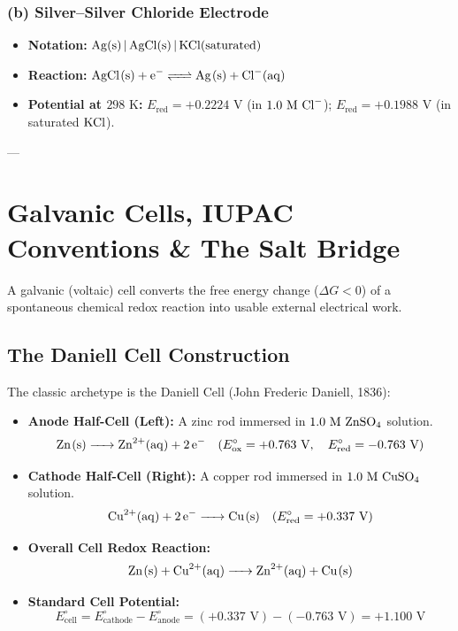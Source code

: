 \subsubsection{(b) Silver--Silver Chloride Electrode}
\begin{itemize}[leftmargin=*]
    \item \textbf{Notation:} $\ce{Ag(s) | AgCl(s) | KCl(saturated)}$
    \item \textbf{Reaction:} $\ce{AgCl(s) + e^- <=> Ag(s) + Cl^-(aq)}$
    \item \textbf{Potential at $298\text{ K}$:} $E_{\text{red}} = +0.2224\text{ V}$ (in $1.0\text{ M } \ce{Cl-}$); $E_{\text{red}} = +0.1988\text{ V}$ (in saturated $\ce{KCl}$).
\end{itemize}

---

\section{Galvanic Cells, IUPAC Conventions \& The Salt Bridge}

A galvanic (voltaic) cell converts the free energy change ($\Delta G < 0$) of a spontaneous chemical redox reaction into usable external electrical work.

\subsection{The Daniell Cell Construction}
The classic archetype is the Daniell Cell (John Frederic Daniell, 1836):
\begin{itemize}[leftmargin=*]
    \item \textbf{Anode Half-Cell (Left):} A zinc rod immersed in $1.0\text{ M } \ce{ZnSO4}$ solution.
    \begin{equation}
        \ce{Zn(s) -> Zn^2+(aq) + 2e^-} \quad (E^\circ_{\text{ox}} = +0.763\text{ V}, \quad E^\circ_{\text{red}} = -0.763\text{ V})
    \end{equation}
    \item \textbf{Cathode Half-Cell (Right):} A copper rod immersed in $1.0\text{ M } \ce{CuSO4}$ solution.
    \begin{equation}
        \ce{Cu^2+(aq) + 2e^- -> Cu(s)} \quad (E^\circ_{\text{red}} = +0.337\text{ V})
    \end{equation}
    \item \textbf{Overall Cell Redox Reaction:}
    \begin{equation}
        \ce{Zn(s) + Cu^2+(aq) -> Zn^2+(aq) + Cu(s)}
    \end{equation}
    \item \textbf{Standard Cell Potential:}
    \begin{equation}
        E^\circ_{\text{cell}} = E^\circ_{\text{cathode}} - E^\circ_{\text{anode}} = (+0.337\text{ V}) - (-0.763\text{ V}) = +1.100\text{ V}
    \end{equation}
\end{itemize}

